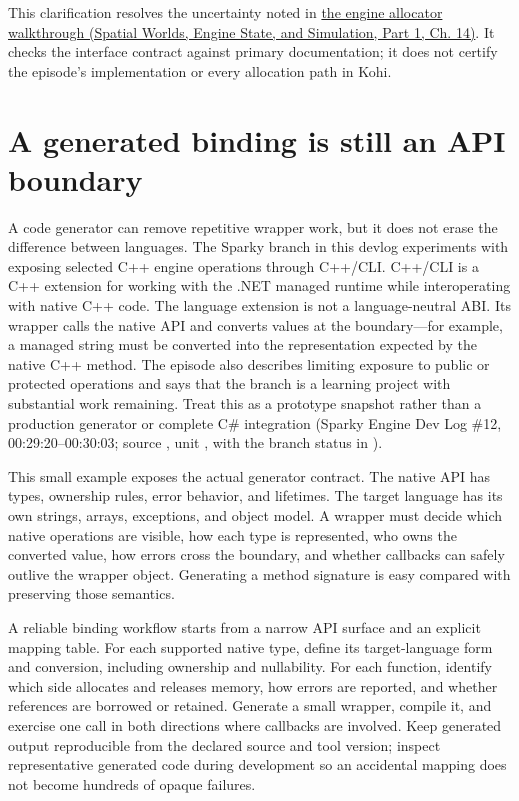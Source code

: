This clarification resolves the uncertainty noted in \href{../05-Spatial-Worlds-Engine-State-and-Simulation-P01/main.pdf\#nameddest=05-engine-i-ch014-bridge-vulkan-allocation-callbacks-to-an-engine-allocator}{the engine allocator walkthrough (Spatial Worlds, Engine State, and Simulation, Part 1, Ch. 14)}. It checks the interface contract against primary documentation; it does not certify the episode's implementation or every allocation path in Kohi.

\section{A generated binding is still an API boundary}\label{05-engine-i-ch024-a-generated-binding-is-still-an-api-boundary}

\hypertarget{05-engine-i-ch024-a-generated-binding-is-still-an-api-boundary}{}

A code generator can remove repetitive wrapper work, but it does not erase the difference between languages. The Sparky branch in this devlog experiments with exposing selected C++ engine operations through C++/CLI. C++/CLI is a C++ extension for working with the .NET managed runtime while interoperating with native C++ code. The language extension is not a language-neutral ABI. Its wrapper calls the native API and converts values at the boundary---for example, a managed string must be converted into the representation expected by the native C++ method. The episode also describes limiting exposure to public or protected operations and says that the branch is a learning project with substantial work remaining. Treat this as a prototype snapshot rather than a production generator or complete C\# integration (Sparky Engine Dev Log \#12, 00:29:20--00:30:03; source , unit , with the branch status in ).

This small example exposes the actual generator contract. The native API has types, ownership rules, error behavior, and lifetimes. The target language has its own strings, arrays, exceptions, and object model. A wrapper must decide which native operations are visible, how each type is represented, who owns the converted value, how errors cross the boundary, and whether callbacks can safely outlive the wrapper object. Generating a method signature is easy compared with preserving those semantics.

A reliable binding workflow starts from a narrow API surface and an explicit mapping table. For each supported native type, define its target-language form and conversion, including ownership and nullability. For each function, identify which side allocates and releases memory, how errors are reported, and whether references are borrowed or retained. Generate a small wrapper, compile it, and exercise one call in both directions where callbacks are involved. Keep generated output reproducible from the declared source and tool version; inspect representative generated code during development so an accidental mapping does not become hundreds of opaque failures.

